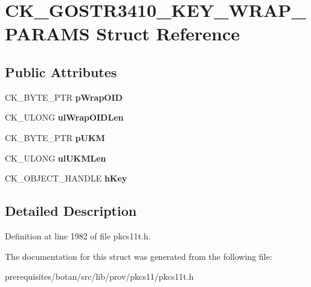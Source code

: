 \hypertarget{struct_c_k___g_o_s_t_r3410___k_e_y___w_r_a_p___p_a_r_a_m_s}{}\section{C\+K\+\_\+\+G\+O\+S\+T\+R3410\+\_\+\+K\+E\+Y\+\_\+\+W\+R\+A\+P\+\_\+\+P\+A\+R\+A\+MS Struct Reference}
\label{struct_c_k___g_o_s_t_r3410___k_e_y___w_r_a_p___p_a_r_a_m_s}
\subsection*{Public Attributes}
\begin{DoxyCompactItemize}
\item 
\mbox{\label{struct_c_k___g_o_s_t_r3410___k_e_y___w_r_a_p___p_a_r_a_m_s_ad0b49c48f5a242ff6781c0ab38137b0f}} 
C\+K\+\_\+\+B\+Y\+T\+E\+\_\+\+P\+TR {\bfseries p\+Wrap\+O\+ID}
\item 
\mbox{\label{struct_c_k___g_o_s_t_r3410___k_e_y___w_r_a_p___p_a_r_a_m_s_a0831bf1a78b7f3f4137e0b235f42c5c4}} 
C\+K\+\_\+\+U\+L\+O\+NG {\bfseries ul\+Wrap\+O\+I\+D\+Len}
\item 
\mbox{\label{struct_c_k___g_o_s_t_r3410___k_e_y___w_r_a_p___p_a_r_a_m_s_ad26392f28b2095f1730bc47a8cbc4221}} 
C\+K\+\_\+\+B\+Y\+T\+E\+\_\+\+P\+TR {\bfseries p\+U\+KM}
\item 
\mbox{\label{struct_c_k___g_o_s_t_r3410___k_e_y___w_r_a_p___p_a_r_a_m_s_a783109c3f3eefa191ab85a04194789a9}} 
C\+K\+\_\+\+U\+L\+O\+NG {\bfseries ul\+U\+K\+M\+Len}
\item 
\mbox{\label{struct_c_k___g_o_s_t_r3410___k_e_y___w_r_a_p___p_a_r_a_m_s_a54e8a52eefdf28a18d19425a3f5542f3}} 
C\+K\+\_\+\+O\+B\+J\+E\+C\+T\+\_\+\+H\+A\+N\+D\+LE {\bfseries h\+Key}
\end{DoxyCompactItemize}


\subsection{Detailed Description}


Definition at line 1982 of file pkcs11t.\+h.



The documentation for this struct was generated from the following file\+:\begin{DoxyCompactItemize}
\item 
prerequisites/botan/src/lib/prov/pkcs11/pkcs11t.\+h\end{DoxyCompactItemize}
